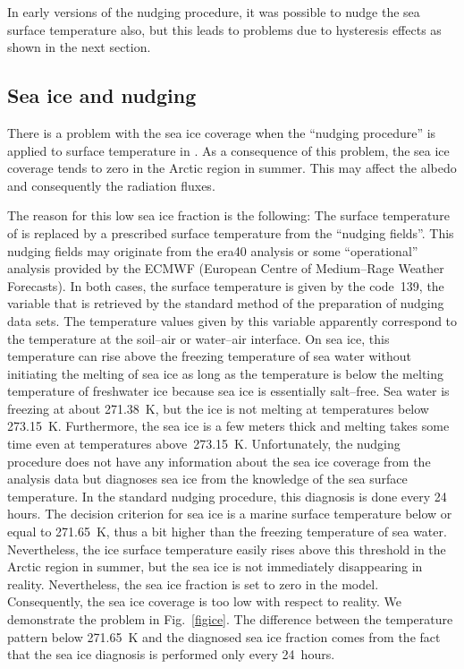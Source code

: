 \begin{appendix}
In early versions of the nudging procedure, it was possible to nudge
the sea surface temperature also, but this leads to problems due to
hysteresis effects as shown in the next section.

\subsection{Sea ice and nudging}

There is a problem with the sea ice coverage when the
``nudging procedure'' is applied to surface temperature in \echam. As a
consequence of this 
problem, the sea ice coverage tends to zero in the Arctic
region in summer. This may affect the albedo and consequently the
radiation fluxes. 

The reason for this low sea ice fraction is the following: The surface
temperature of \echam{} is replaced by a prescribed surface
temperature from the ``nudging fields''. This nudging fields may
originate from the era40 analysis or some ``operational'' analysis
provided by the ECMWF (European Centre of Medium--Rage Weather
Forecasts). In both cases, the surface temperature is given by the 
code~139, the variable that is retrieved by the standard method of
the preparation of nudging data sets. The temperature values
given by this variable apparently correspond to the temperature at the
soil--air or water--air interface. On sea ice, this temperature can
rise above the freezing temperature of sea water without initiating
the melting of sea ice as long as the temperature is below the melting
temperature of freshwater ice because sea ice is essentially
salt--free. Sea water is freezing at about 271.38~K, but the ice is
not melting at temperatures below 273.15~K. Furthermore, the sea ice
is a few meters thick and melting takes some time even at temperatures
above~273.15~K. Unfortunately, the
nudging procedure does not have any information about the sea ice
coverage from the analysis data but diagnoses sea ice from the
knowledge of the sea surface temperature. In the standard nudging
procedure, this diagnosis is done every 24 hours. The decision
criterion for sea ice is a marine surface temperature below or equal
to 271.65~K, thus a bit higher than the freezing temperature of sea
water. Nevertheless, the ice surface temperature easily rises above
this threshold in the Arctic region in summer, but the sea ice is not
immediately disappearing in reality. Nevertheless, the sea ice fraction is set
to zero in the model. Consequently, the sea ice
coverage is too low with respect to reality. We demonstrate the
problem in Fig.~\ref{figice}. The difference between the temperature
pattern below 271.65~K and the diagnosed sea ice fraction comes 
from the fact that the sea ice diagnosis is performed only every 24~hours.


\end{appendix}
